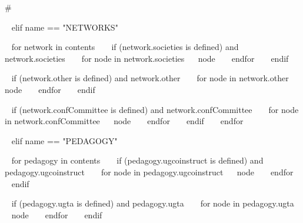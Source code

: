 \begin{minipage}{\textwidth}
{%
#}




~{ elif name == "NETWORKS" }~
\begin{entrylist}

~{ for network in contents }~
  ~{ if (network.societies is defined) and network.societies }~
    ~{ for node in network.societies}~
    \entry
      {}
      {~{{ node }}~}
      {}
      {}
    ~{ endfor }~
  ~{ endif }~

  ~{ if (network.other is defined) and network.other }~
    ~{ for node in network.other}~
    \entry
      {}
      {~{{ node }}~}
      {}
      {}
    ~{ endfor }~
  ~{ endif }~

  ~{ if (network.confCommittee is defined) and network.confCommittee }~
    ~{ for node in network.confCommittee}~
    \entry
      {}
      {~{{ node }}~}
      {}
      {}
    ~{ endfor }~
  ~{ endif }~
~{ endfor }~

\end{entrylist}



~{ elif name == "PEDAGOGY" }~
\begin{entrylist}

~{ for pedagogy in contents }~
  ~{ if (pedagogy.ugcoinstruct is defined) and pedagogy.ugcoinstruct }~
    ~{ for node in pedagogy.ugcoinstruct}~
    \entry
      {}
      {~{{ node }}~}
      {}
      {}
    ~{ endfor }~
  ~{ endif }~

  ~{ if (pedagogy.ugta is defined) and pedagogy.ugta }~
    ~{ for node in pedagogy.ugta}~
    \entry
      {}
      {~{{ node }}~}
      {}
      {}
    ~{ endfor }~
  ~{ endif }~


\end{entrylist}
\end{minipage}
